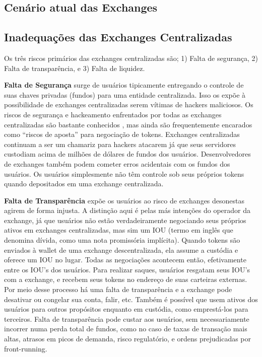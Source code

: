 \documentclass[UTF8,nofonts]{article}
\begin{document}
\begin{multicols}{2}
\section{Cenário atual das Exchanges\label{sec:current_exchange_landscape}}

\subsection{Inadequações das Exchanges Centralizadas}
Os três riscos primários das exchanges centralizadas são; 1) Falta de segurança, 2) Falta de transparência, e 3) Falta de liquidez.

\textbf{Falta de Segurança} surge de usuários tipicamente entregando o controle de suas chaves privadas (fundos) para uma entidade centralizada. Isso os expõe à possibilidade de exchanges centralizadas serem vítimas de hackers maliciosos. Os riscos de segurança e hackeamento enfrentados por todas as exchanges centralizadas são bastante conhecidos \cite{coincheckhack} \cite{mcmillan2014inside}, mas ainda são frequentemente encarados como \enquote{riscos de aposta} para negociação de tokens. Exchanges centralizadas continuam a ser um chamariz para hackers atacarem já que seus servidores custodiam acima de milhões de dólares de fundos dos usuários. Desenvolvedores de exchanges também podem cometer erros acidentais com os fundos dos usuários. Os usuários simplesmente não têm controle sob seus próprios tokens quando depositados em uma exchange centralizada.

\textbf{Falta de Transparência} expõe os usuários ao risco de exchanges desonestas agirem de forma injusta. A distinção aqui é pelas más intenções do operador da exchange, já que usuários não estão verdadeiramente negociando seus próprios ativos em exchanges centralizadas, mas sim um IOU (termo em inglês que denomina dívida, como uma nota promissória implícita). Quando tokens são enviados à wallet de uma exchange descentralizada, ela assume a custódia e oferece um IOU no lugar. Todas as negociações acontecem então, efetivamente entre os IOU's dos usuários. Para realizar saques, usuários resgatam seus IOU's com a exchange, e recebem seus tokens no endereço de suas carteiras externas. Por meio desse processo há uma falta de transparência e a exchange pode desativar ou congelar sua conta, falir, etc. Também é possível que usem ativos dos usuários para outros propósitos enquanto em custódia, como emprestá-los para terceiros. Falta de transparência pode custar aos usuários, sem necessariamente incorrer numa perda total de fundos, como no caso de taxas de transação mais altas, atrasos em picos de demanda, risco regulatório, e ordens prejudicadas por front-running.


\end{multicols}
\end{document}
